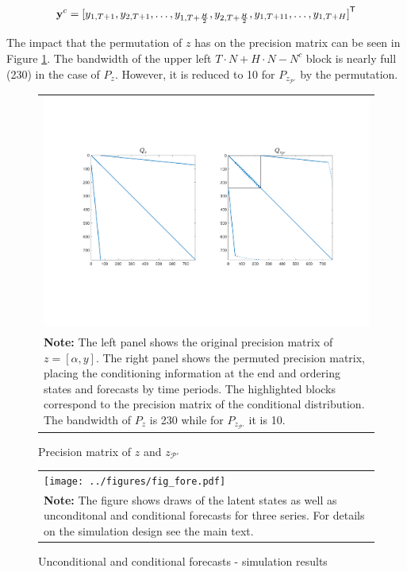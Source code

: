 \documentclass[notitlepage,a4paper,12pt]{article}
\newcommand{\transpose}[1]{{#1}^{\sf{T}}}
\begin{document}
$$\mathbf{y}^c = \transpose{[y_{1,T+1}, y_{2,T+1}, \dots, y_{1,T+\frac{H}{2}}, y_{2,T+\frac{H}{2}}, y_{1,T+11}, \dots, y_{1,T+H}]}
$$

The impact that the permutation of $z$ has on the precision matrix can be seen in Figure \ref{fig_Pperm}. The bandwidth of the upper left $T\!\cdot\!N + H\!\cdot\!N - N^c$ block is nearly full (230) in the case of $P_z$. However, it is reduced to 10 for $P_{z_{\mathcal{P}'}}$ by the permutation. 

\begin{figure}[htbp] \centering
    \caption{Precision matrix of $z$ and $z_{\mathcal{P}'}$\label{fig_Pperm}}
    \footnotesize
    \begin{tabular}{p{16cm}}
    \includegraphics*[scale=0.5,clip,trim=10 60 10 60]{../figures/fig_P_perm.pdf} \\
    \footnotesize \textbf{Note:} The left panel shows the original precision matrix of $z=[\alpha, y]$. The right panel shows the permuted precision matrix, placing the conditioning information at the end and ordering states and forecasts by time periods. The highlighted blocks correspond to the precision matrix of the conditional distribution. The bandwidth of $P_z$ is 230 while for $P_{z_{\mathcal{P}'}}$ it is 10. 
    \end{tabular}
    \newline
    \normalsize
\end{figure}

\begin{figure}[htbp] \centering
    \caption{Unconditional and conditional forecasts - simulation results\label{fig_simfore}}
    \footnotesize
    \begin{tabular}{p{16cm}}
    \texttt{[image: ../figures/fig\_fore.pdf]} \\
    \footnotesize \textbf{Note:} The figure shows draws of the latent states as well as unconditonal and conditional forecasts for three series. For details on the simulation design see the main text.
    \end{tabular}
    \newline
    \normalsize
\end{figure}
\end{document}
